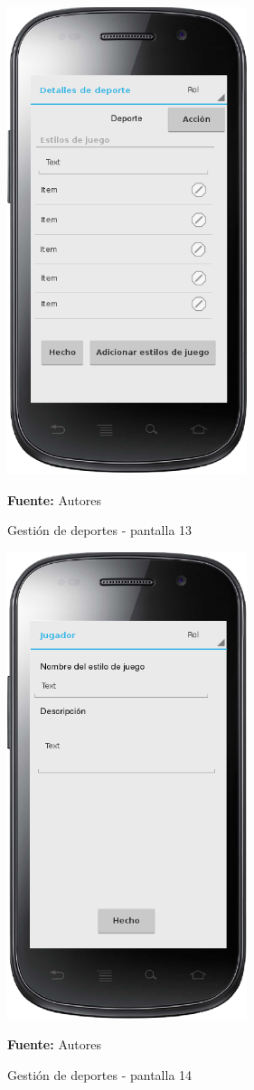 \begin{figure}[!htb]
  \begin{center}
    \includegraphics[width=7cm]{./imagenes/UI/Deportes/gestion_deportes_13.png}
    \caption{Gestión de deportes - pantalla 13}
    \label{fig:gestion_deportes_13}
    \textbf{Fuente:}  Autores
  \end{center}
\end{figure}

\begin{figure}[!htb]
  \begin{center}
    \includegraphics[width=7cm]{./imagenes/UI/Deportes/gestion_deportes_14.png}
    \caption{Gestión de deportes - pantalla 14}
    \label{fig:gestion_deportes_14}
    \textbf{Fuente:}  Autores
  \end{center}
\end{figure}